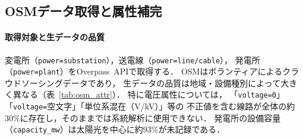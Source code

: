 \documentclass[fleqn]{ieej}
\begin{document}
\subsection{OSMデータ取得と属性補完}

\paragraph{取得対象と生データの品質}
変電所（\texttt{power=substation}），送電線（\texttt{power=line/cable}），
発電所（\texttt{power=plant}）をOverpass~API\cite{overpass}で取得する．
OSMはボランティアによるクラウドソーシングデータであり，
生データの品質は地域・設備種別によって大きく異なる（表~\ref{tab:osm_attr}）．
特に電圧属性については，
「\texttt{voltage=0}」「\texttt{voltage=}空文字」「単位系混在（V/kV）」等の
不正値を含む線路が全体の約30\%に存在し，そのままでは系統解析に使用できない．
発電所の設備容量（\texttt{capacity\_mw}）は太陽光を中心に約93\%が未記録である．
\end{document}
